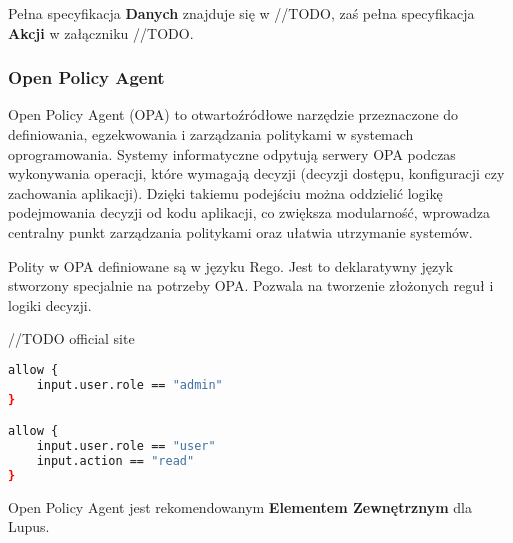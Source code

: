 Pełna specyfikacja \textbf{Danych} znajduje się w //TODO, zaś pełna specyfikacja \textbf{Akcji} w załączniku //TODO.

\subsubsection{Open Policy Agent}

Open Policy Agent (OPA) to otwartoźródłowe narzędzie przeznaczone do definiowania, egzekwowania i zarządzania politykami w systemach oprogramowania. Systemy informatyczne odpytują serwery OPA podczas wykonywania operacji, które wymagają decyzji (decyzji dostępu, konfiguracji czy zachowania aplikacji). Dzięki takiemu podejściu można oddzielić logikę podejmowania decyzji od kodu aplikacji, co zwiększa modularność, wprowadza centralny punkt zarządzania politykami oraz ułatwia utrzymanie systemów.

Polity w OPA definiowane są w języku Rego. Jest to deklaratywny język stworzony specjalnie na potrzeby OPA. Pozwala na tworzenie złożonych reguł i logiki decyzji.

//TODO official site

\begin{lstlisting}[language=sh, caption={\emph{Przykładowy kod rego}}]
allow {
    input.user.role == "admin"
}

allow {
    input.user.role == "user"
    input.action == "read"
}
\end{lstlisting}

Open Policy Agent jest rekomendowanym \textbf{Elementem Zewnętrznym} dla Lupus.